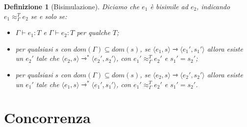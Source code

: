 \documentclass[a4paper, 11pt]{article}
\newtheorem{definit}{Definizione}[section]
\newcommand{\type}{\Gamma \vdash}
\newcommand{\goesto}{\rightarrowtriangle}
\begin{document}
\begin{definit}[Bisimulazione]
	Diciamo che $e_1$ è bisimile ad $e_2$, indicando $e_1 \approx_\Gamma^T e_2$ se e solo se:\begin{itemize}
		\item $\type e_1:T$ e $\type e_2:T$ per qualche $T$;
		\item per qualsiasi $s$ con $dom(\Gamma) \subseteq dom(s)$, se $\langle e_1, s\rangle \goesto \langle e_1',s_1' \rangle$ allora esiste un $e_2'$ tale che $\langle e_2, s \rangle \goesto^\ast \langle e_2',s_2' \rangle$, con $e_1' \approx_\Gamma^T e_2'$ e $s_1'=s_2'$;
		\item per qualsiasi $s$ con $dom(\Gamma) \subseteq dom(s)$, se $\langle e_2, s\rangle \goesto \langle e_2',s_2' \rangle$ allora esiste un $e_1'$ tale che $\langle e_1, s \rangle \goesto^\ast \langle e_1',s_1' \rangle$, con $e_1' \approx_\Gamma^T e_2'$ e $s_1'=s_2'$.
	\end{itemize}
\end{definit}







\newpage
\section{Concorrenza}
\end{document}
